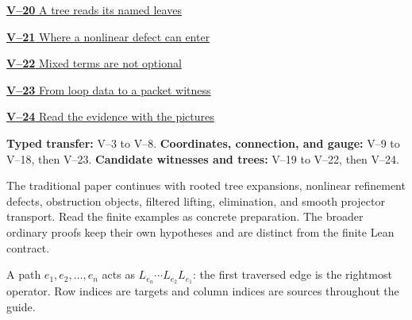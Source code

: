 \documentclass[11pt,a4paper]{article}
\newcommand{\head}[1]{\par\vspace{2pt}{\sffamily\bfseries\normalsize #1}\par\vspace{1pt}}
\begin{document}
\begin{multicols}{2}
{\small\noindent\hyperlink{vpage20}{\textbf{V--20} A tree reads its named leaves}\par\smallskip}
{\small\noindent\hyperlink{vpage21}{\textbf{V--21} Where a nonlinear defect can enter}\par\smallskip}
{\small\noindent\hyperlink{vpage22}{\textbf{V--22} Mixed terms are not optional}\par\smallskip}
{\small\noindent\hyperlink{vpage23}{\textbf{V--23} From loop data to a packet witness}\par\smallskip}
{\small\noindent\hyperlink{vpage24}{\textbf{V--24} Read the evidence with the pictures}\par\smallskip}

\end{multicols}
\medskip
\head{Three reading routes}
\textbf{Typed transfer:} V--3 to V--8.
\textbf{Coordinates, connection, and gauge:} V--9 to V--18, then V--23.
\textbf{Candidate witnesses and trees:} V--19 to V--22, then V--24.
\head{From the finite models to the broader paper}
The traditional paper continues with rooted tree expansions, nonlinear
refinement defects, obstruction objects, filtered lifting, elimination, and
smooth projector transport. Read the finite examples as concrete preparation.
The broader ordinary proofs keep their own hypotheses and are distinct from
the finite Lean contract.

\head{Read products in traversal order}
A path $e_1,e_2,\ldots,e_n$ acts as $L_{e_n}\cdots L_{e_2}L_{e_1}$:
the first traversed edge is the rightmost operator. Row indices are targets
and column indices are sources throughout the guide.
\clearpage
{}

\end{document}
